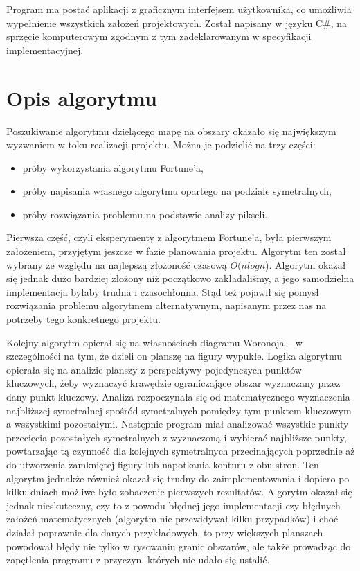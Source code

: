 \documentclass[a4paper,12pt]{article}
\newcommand\tab[1][0.6cm]{\hspace*{#1}}
\begin{document}
Program ma postać aplikacji z graficznym interfejsem użytkownika, co umożliwia wypełnienie wszystkich założeń projektowych. Został napisany w języku C\#, na sprzęcie komputerowym zgodnym z tym zadeklarowanym w specyfikacji implementacyjnej. 


\newpage

\section{Opis algorytmu}

\tab Poszukiwanie algorytmu dzielącego mapę na obszary okazało się największym wyzwaniem w toku realizacji projektu. Można je podzielić na trzy części:

\begin{itemize}
\item próby wykorzystania algorytmu Fortune'a,
\item próby napisania własnego algorytmu opartego na podziale symetralnych,
\item próby rozwiązania problemu na podstawie analizy pikseli.
\end{itemize}

Pierwsza część, czyli eksperymenty z algorytmem Fortune'a, była pierwszym założeniem, przyjętym jeszcze w fazie planowania projektu. Algorytm ten został wybrany ze względu na najlepszą złożoność czasową $O(n log n$). Algorytm okazał się jednak dużo bardziej złożony niż początkowo zakładaliśmy, a jego samodzielna implementacja byłaby trudna i czasochłonna. Stąd też pojawił się pomysł rozwiązania problemu algorytmem alternatywnym, napisanym przez nas na potrzeby tego konkretnego projektu. 

Kolejny algorytm opierał się na własnościach diagramu Woronoja -- w szczególności na tym, że dzieli on planszę na figury wypukłe. Logika algorytmu opierała się na analizie planszy z perspektywy pojedynczych punktów kluczowych, żeby wyznaczyć krawędzie ograniczające obszar wyznaczany przez dany punkt kluczowy. Analiza rozpoczynała się od matematycznego wyznaczenia najbliższej symetralnej spośród symetralnych pomiędzy tym punktem kluczowym a wszystkimi pozostałymi. Następnie program miał analizować wszystkie punkty przecięcia pozostałych symetralnych z wyznaczoną i wybierać najbliższe punkty, powtarzając tą czynność dla kolejnych symetralnych przecinających poprzednie aż do utworzenia zamkniętej figury lub napotkania konturu z obu stron. Ten algorytm jednakże również okazał się trudny do zaimplementowania i dopiero po kilku dniach możliwe było zobaczenie pierwszych rezultatów. Algorytm okazał się jednak nieskuteczny, czy to z powodu błędnej jego implementacji czy błędnych założeń matematycznych (algorytm nie przewidywał kilku przypadków) i choć działał poprawnie dla danych przykładowych, to przy większych planszach powodował błędy nie tylko w rysowaniu granic obszarów, ale także prowadząc do zapętlenia programu z przyczyn, których nie udało się ustalić.
\end{document}
